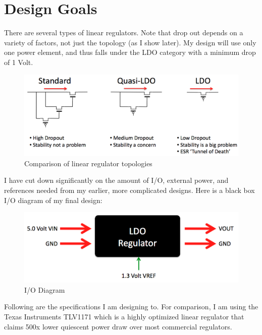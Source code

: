 \documentclass[10pt]{amsart}
\begin{document}
\section{Design Goals}

There are several types of linear regulators. Note that drop out depends on a variety of factors, not just the topology (as I show later). My design will use only one power element, and thus falls under the LDO category with a minimum drop of 1 Volt.

\begin{figure}[h]
	\begin{center}
		\includegraphics[width=6in]{Media/ldos.png}
	\end{center}
	\caption{Comparison of linear regulator topologies}
	\label{fig:wl}
\end{figure}

I have cut down significantly on the amount of I/O, external power, and references needed from my earlier, more complicated designs. Here is a black box I/O diagram of my final design: 

\begin{figure}[h]
	\begin{center}
		\includegraphics[width=6in]{Media/black.png}
	\end{center}
	\caption{I/O Diagram}
	\label{fig:black}
\end{figure}

Following are the specifications I am designing to. For comparison, I am using the Texas Instruments TLV1171 which is a highly optimized linear regulator that claims 500x lower quiescent power draw over most commercial regulators.
\end{document}
